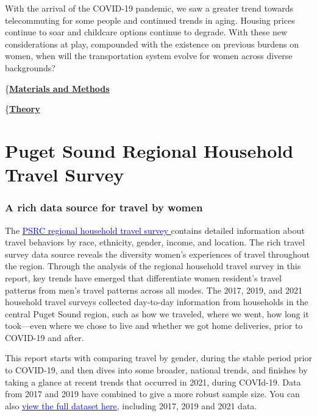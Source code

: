 \documentclass[
  12pt,
]{article}
\begin{document}
\begin{flushleft}
With the arrival of the COVID-19 pandemic, we saw a greater trend towards telecommuting for some people and continued trends in aging. Housing prices continue to soar and childcare options continue to degrade. With these new considerations at play, compounded with the existence on previous burdens on women, when will the transportation system evolve for women across diverse backgrounds?
\end{flushleft}

\newpage
\pagestyle{otherpages}
\setlength{\headheight}{10pt}
\setlength{\textheight}{665pt}
\fancyhead[L]{}

\{\underline{\textbf{Materials and Methods}}

\{\underline{\textbf{Theory}}

\hypertarget{puget-sound-regional-household-travel-survey}{%
\section{Puget Sound Regional Household Travel
Survey}\label{puget-sound-regional-household-travel-survey}}

\hypertarget{a-rich-data-source-for-travel-by-women}{%
\subsubsection{A rich data source for travel by
women}\label{a-rich-data-source-for-travel-by-women}}

\begin{flushleft}
The  \href{https://www.psrc.org/our-work/household-travel-survey-program}{\underline{\textcolor{blue}{PSRC regional household travel survey }}} contains detailed information about travel behaviors by race, ethnicity, gender, income, and location. The rich travel survey data source reveals the diversity women's experiences of travel throughout the region. Through the analysis of the regional household travel survey in this report, key trends have emerged that differentiate women resident's travel patterns from men's travel patterns across all modes. The 2017, 2019, and 2021 household travel surveys collected day-to-day information from households in the central Puget Sound region, such as how we traveled, where we went, how long it took—even where we chose to live and whether we got home deliveries, prior to COVID-19 and after.


This report starts with comparing travel by gender, during the stable period prior to COVID-19, and then dives into some broader, national trends, and finishes by taking a glance at recent trends that occurred in 2021, during COVId-19. Data from 2017 and 2019 have combined to give a more robust sample size.  You can also \href{https://household-travel-survey-psregcncl.hub.arcgis.com}{\underline{\textcolor{blue}{view the full dataset here}}}, including 2017, 2019 and 2021 data. 
\end{flushleft}
\end{document}
